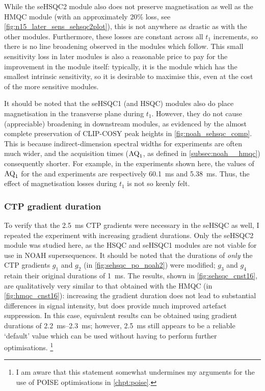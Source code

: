 While the \nitrogen{} seHSQC2 module also does not preserve  magnetisation as well as the HMQC module (with an approximately 20\% loss, see \cref{fig:n15_later_sens_sehsqc2plot}), this is not anywhere as drastic as with the other modules.
Furthermore, these losses are constant across all $t_1$ increments, so there is no line broadening observed in the modules which follow.
This small sensitivity loss in later modules is also a reasonable price to pay for the improvement in the \nitrogen{} module itself: typically, it is the \nitrogen{} module which has the smallest intrinsic sensitivity, so it is desirable to maximise this, even at the cost of the more sensitive modules.

It should be noted that the \carbon{} seHSQC1 (and HSQC) modules also do place  magnetisation in the transverse plane during $t_1$.
However, they do not cause (appreciable) broadening in downstream modules, as evidenced by the almost complete preservation of CLIP-COSY peak heights in \cref{fig:noah_sehsqc_comp}.
This is because indirect-dimension spectral widths for \carbon{} experiments are often much wider, and the acquisition times ($\text{AQ}_1$, as defined in \cref{subsec:noah__hmqc}) consequently shorter.
For example, in the  experiments shown here, the values of $\text{AQ}_1$ for the \nitrogen{} and \carbon{} experiments are respectively \qty{60.1}{\ms} and \qty{5.38}{\ms}.
Thus, the effect of magnetisation losses during $t_1$ is not so keenly felt.


\subsubsection{CTP gradient duration}

To verify that the \qty{2.5}{\ms} CTP gradients were necessary in the \nitrogen{} seHSQC as well, I repeated the  experiment with increasing gradient durations.
Only the seHSQC2 module was studied here, as the HSQC and seHSQC1 modules are not viable for use in NOAH supersequences.
It should be noted that the durations of \textit{only} the CTP gradients $g_1$ and $g_2$ (in \cref{fig:sehsqc_po_noah2}) were modified; $g_3$ and $g_4$ retain their original durations of \qty{1}{\ms}.
The results, shown in \cref{fig:sehsqc_cnst16}, are qualitatively very similar to that obtained with the HMQC (in \cref{fig:hmqc_cnst16}): increasing the gradient duration does not lead to substantial differences in signal intensity, but does provide much improved artefact suppression.
In this case, equivalent results can be obtained using gradient durations of \qtyrange{2.2}{2.3}{\ms}; however, \qty{2.5}{\ms} still appears to be a reliable `default' value which can be used without having to perform further optimisations.%
\footnote{I am aware that this statement somewhat undermines my arguments for the use of POISE optimisations in \cref{chpt:poise}.}

